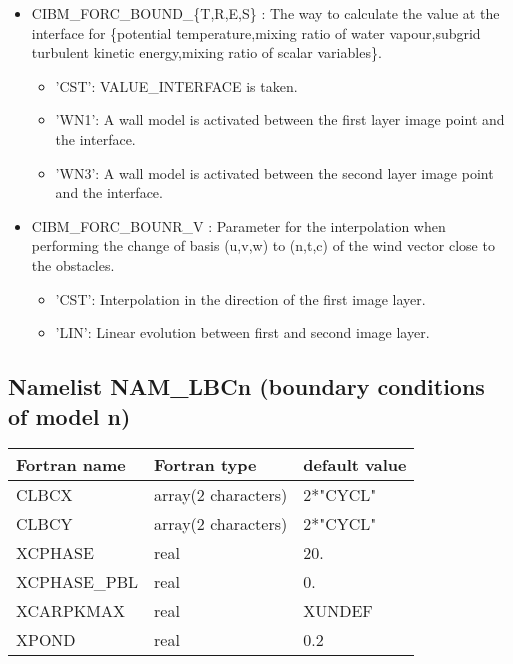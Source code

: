\begin{itemize}
\item CIBM\_FORC\_BOUND\_\{T,R,E,S\} :
The way to calculate the value at the interface for \{potential
temperature,mixing ratio of water vapour,subgrid turbulent kinetic energy,mixing ratio of
scalar variables\}.
\begin{itemize}
\item 'CST': VALUE\_INTERFACE is taken.
\item 'WN1': A wall model is activated between the first layer image point and the interface.
\item 'WN3': A wall model is activated between the second layer image point and the interface.
\end{itemize}

\item CIBM\_FORC\_BOUNR\_V :
Parameter for the interpolation when performing the change of basis (u,v,w) to (n,t,c) of the wind
vector close to the obstacles.
\begin{itemize}
\item 'CST': Interpolation in the direction of the first image layer.
\item 'LIN': Linear evolution between first and second image layer.
\end{itemize}

\end{itemize}

\subsection{Namelist NAM\_LBCn (boundary conditions of model n)}

\begin{center}
\begin{tabular} {|l|l|l|}
\hline
Fortran name & Fortran type & default value \\
\hline
CLBCX        &  array(2 characters) & 2*"CYCL" \\
CLBCY        &  array(2 characters) & 2*"CYCL" \\
XCPHASE      & real                 &  20.     \\
XCPHASE\_PBL & real                 &  0.      \\
XCARPKMAX    & real                 &  XUNDEF  \\
XPOND        & real                 &  0.2  \\
\hline
\end{tabular}
\end{center}


